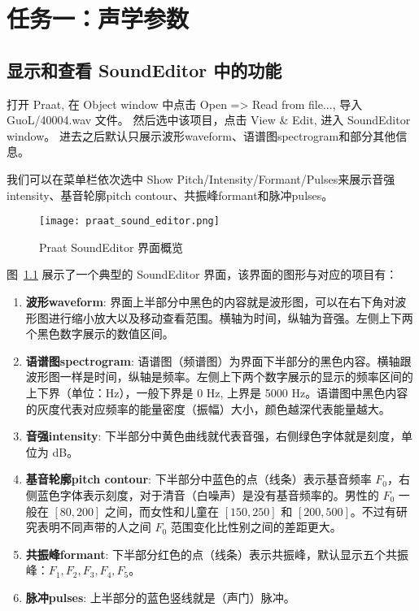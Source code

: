\chapter{任务一：声学参数}
\label{chap:task1}

\section{显示和查看 SoundEditor 中的功能}

打开 Praat, 在 Object window 中点击 Open => Read from file..., 导入 GuoL/40004.wav 文件。
然后选中该项目，点击 View \& Edit, 进入 SoundEditor window。
进去之后默认只展示波形waveform、语谱图spectrogram和部分其他信息。

我们可以在菜单栏依次选中 Show Pitch/Intensity/Formant/Pulses来展示音强intensity、基音轮廓pitch contour、共振峰formant和脉冲pulses。

\begin{figure}[H]
  \centering
  \texttt{[image: praat\_sound\_editor.png]}
  \caption{Praat SoundEditor 界面概览}
  \label{fig:praat_sound_editor}
\end{figure}

图~\ref{fig:praat_sound_editor} 展示了一个典型的 SoundEditor 界面，该界面的图形与对应的项目有：

\begin{enumerate}
  \item \textbf{波形waveform}: 界面上半部分中黑色的内容就是波形图，可以在右下角对波形图进行缩小放大以及移动查看范围。横轴为时间，纵轴为音强。左侧上下两个黑色数字展示的数值区间。
  \item \textbf{语谱图spectrogram}: 语谱图（频谱图）为界面下半部分的黑色内容。横轴跟波形图一样是时间，纵轴是频率。左侧上下两个数字展示的显示的频率区间的上下界（单位：Hz），一般下界是 0 Hz, 上界是 5000 Hz。语谱图中黑色内容的灰度代表对应频率的能量密度（振幅）大小，颜色越深代表能量越大。
  \item \textbf{音强intensity}: 下半部分中黄色曲线就代表音强，右侧绿色字体就是刻度，单位为 dB。
  \item \textbf{基音轮廓pitch contour}: 下半部分中蓝色的点（线条）表示基音频率 $F_0$，右侧蓝色字体表示刻度，对于清音（白噪声）是没有基音频率的。男性的 $F_0$ 一般在 $[80, 200]$ 之间，而女性和儿童在 $[150, 250]$ 和 $[200, 500]$。不过有研究表明不同声带的人之间 $F_0$ 范围变化比性别之间的差距更大。
  \item \textbf{共振峰formant}: 下半部分红色的点（线条）表示共振峰，默认显示五个共振峰：$F_1, F_2, F_3, F_4, F_5$。
  \item \textbf{脉冲pulses}: 上半部分的蓝色竖线就是（声门）脉冲。
\end{enumerate}

